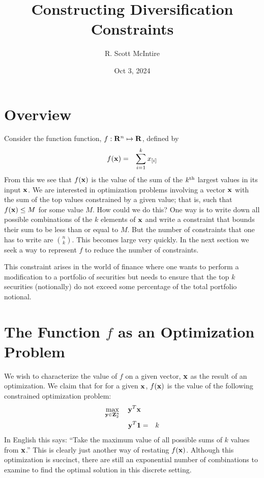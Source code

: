 \documentclass[12pt]{article}
\title{Constructing Diversification Constraints}
\author{R. Scott McIntire}
\date{Oct 3, 2024}
\begin{document}
\maketitle

\section{Overview}
Consider the function function, $f: {\bf R}^n \mapsto {\bf R}$, defined by
\begin{eqnarray}
	f({\bf x}) & = & \sum_{i=1}^k x_{[i]} 
\end{eqnarray}
From this we see that $f({\bf x})$ is the value of the sum of the $k^{\rm th}$ 
largest values in its input ${\bf x}$.
We are interested in optimization problems involving a vector ${\bf x}$ 
with the sum of the top values constrained by a given value; that is, 
such that $f({\bf x}) \le M$  for some value $M$.
How could we do this? One way is to write down all possible combinations of the 
$k$ elements of ${\bf x}$ and write a constraint that bounds their sum to be 
less than or equal to $M$.  But the number of constraints that one has to 
write are $n \choose k$. This becomes large very quickly. 
In the next section we seek a way to represent $f$ to 
reduce the number of constraints.

This constraint arises in the world of finance where one wants to perform
a modification to a portfolio of securities but needs to ensure that the 
top $k$ securities (notionally) do not exceed some percentage of the 
total portfolio notional.

\section{The Function $f$ as an Optimization Problem}
We wish to characterize the value of $f$ on a given vector, ${\bf x}$ as 
the result of an optimization.
We claim that for for a given ${\bf x}$, $f({\bf x})$ is the value of 
the following constrained optimization problem:
\begin{eqnarray}
\mathop{\rm max}_{{\bf y} \in {\bf Z}_2^n}\limits \quad {\bf y}^T {\bf x} && \\
{\bf y}^T {\bf 1} & = & k 
\end{eqnarray}
In English this says: ``Take the maximum value of all possible sums of $k$ values from ${\bf x}$.''
This is clearly just another way of restating $f({\bf x})$.
Although this optimization is succinct, there are still an exponential number of combinations 
to examine to find the optimal solution in this discrete setting.
\end{document}
